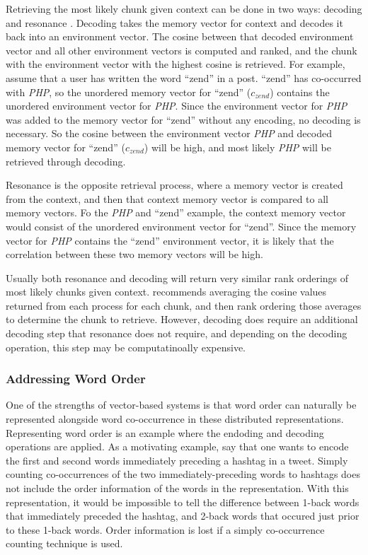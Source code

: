 \documentclass[man,floatsintext]{apa6}
\begin{document}
Retrieving the most likely chunk given context can be done in two ways: decoding and resonance \parencite{Jones2007}.
Decoding takes the memory vector for context and decodes it back into an environment vector.
The cosine between that decoded environment vector and all other environment vectors is computed and ranked, and the chunk with the environment vector with the highest cosine is retrieved.
For example, assume that a user has written the word ``zend'' in a post.
``zend'' has co-occurred with \emph{PHP}, so the unordered memory vector for ``zend'' ($c_{zend}$) contains the unordered environment vector for \emph{PHP}.
Since the environment vector for \emph{PHP} was added to the memory vector for ``zend'' without any encoding, no decoding is necessary.
So the cosine between the environment vector \emph{PHP} and decoded memory vector for ``zend'' ($c_{zend}$) will be high, and most likely \emph{PHP} will be retrieved through decoding.

Resonance is the opposite retrieval process, where a memory vector is created from the context, and then that context memory vector is compared to all memory vectors.
Fo the \emph{PHP} and ``zend'' example, the context memory vector would consist of the unordered environment vector for ``zend''.
Since the memory vector for \emph{PHP} contains the ``zend'' environment vector, it is likely that the correlation between these two memory vectors will be high.

Usually both resonance and decoding will return very similar rank orderings of most likely chunks given context.
\textcite{Jones2007} recommends averaging the cosine values returned from each process for each chunk, and then rank ordering those averages to determine the chunk to retrieve.
However, decoding does require an additional decoding step that resonance does not require, and depending on the decoding operation, this step may be computatinoally expensive.

\subsubsection{Addressing Word Order}

One of the strengths of vector-based systems is that word order can naturally be represented alongside word co-occurrence in these distributed representations.
Representing word order is an example where the endoding and decoding operations are applied.
As a motivating example, say that one wants to encode the first and second words immediately preceding a hashtag in a tweet.
Simply counting co-occurrences of the two immediately-preceding words to hashtags does not include the order information of the words in the representation.
With this representation, it would be impossible to tell the difference between 1-back words that immediately preceded the hashtag, and 2-back words that occured just prior to these 1-back words.
Order information is lost if a simply co-occurrence counting technique is used.
\end{document}
